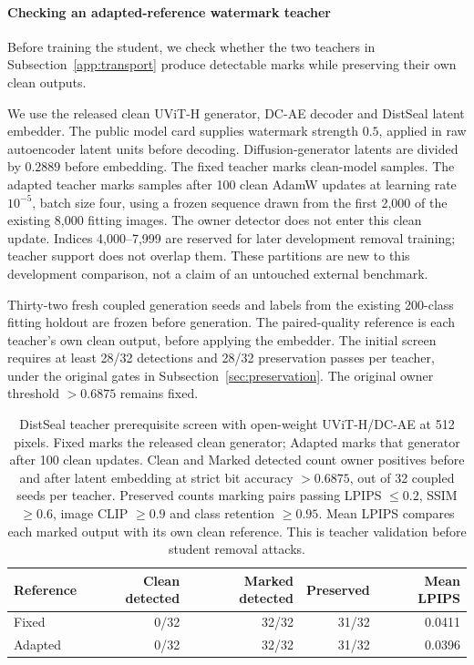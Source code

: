 \paragraph{Checking an adapted-reference watermark teacher}
\label{sec:transport_teacher}
Before training the student, we check whether the two teachers in Subsection~\ref{app:transport} produce detectable marks while preserving their own clean outputs.

We use the released clean UViT-H generator, DC-AE decoder and DistSeal latent embedder. The public model card supplies watermark strength $0.5$, applied in raw autoencoder latent units before decoding. Diffusion-generator latents are divided by $0.2889$ before embedding. The fixed teacher marks clean-model samples. The adapted teacher marks samples after 100 clean AdamW updates at learning rate $10^{-5}$, batch size four, using a frozen sequence drawn from the first 2,000 of the existing 8,000 fitting images. The owner detector does not enter this clean update. Indices 4,000--7,999 are reserved for later development removal training; teacher support does not overlap them. These partitions are new to this development comparison, not a claim of an untouched external benchmark.

Thirty-two fresh coupled generation seeds and labels from the existing 200-class fitting holdout are frozen before generation. The paired-quality reference is each teacher's own clean output, before applying the embedder. The initial screen requires at least 28/32 detections and 28/32 preservation passes per teacher, under the original gates in Subsection~\ref{sec:preservation}. The original owner threshold $>0.6875$ remains fixed.

\begin{table}[ht]\centering\small
\begin{tabular}{lrrrr}\toprule
Reference & Clean detected & Marked detected & Preserved & Mean LPIPS\\\midrule
Fixed & 0/32 & 32/32 & 31/32 & 0.0411\\
Adapted & 0/32 & 32/32 & 31/32 & 0.0396\\\bottomrule
\end{tabular}
\caption{DistSeal teacher prerequisite screen with open-weight UViT-H/DC-AE at 512 pixels. Fixed marks the released clean generator; Adapted marks that generator after 100 clean updates. Clean and Marked detected count owner positives before and after latent embedding at strict bit accuracy $>0.6875$, out of 32 coupled seeds per teacher. Preserved counts marking pairs passing LPIPS $\leq0.2$, SSIM $\geq0.6$, image CLIP $\geq0.9$ and class retention $\geq0.95$. Mean LPIPS compares each marked output with its own clean reference. This is teacher validation before student removal attacks.}
\end{table}

